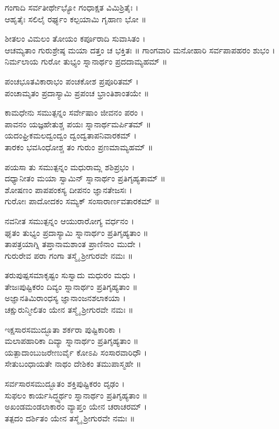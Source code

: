 ಗಂಗಾದಿ ಸರ್ವತೀರ್ಥೇಭ್ಯೋ ಗಂಧಾಕ್ಷತ ವಿಮಿಶ್ರಿತೈಃ ।\\
ಆಹೃತೈಃ ಸಲಿಲೈ ರರ್ಘ್ಯಂ ಕಲ್ಪಯಾಮಿ ಗೃಹಾಣ ಭೋ ॥

ಶೀತಲಂ ವಿಮಲಂ ತೋಯಂ ಕರ್ಪೂರಾದಿ ಸುವಾಸಿತಂ ।\\
ಆಚಮ್ಯತಾಂ ಗುರುಶ್ರೇಷ್ಠ ಮಯಾ ದತ್ತಂ ಚ ಭಕ್ತಿತಃ ॥
\newpage
ಗಾಂಗವಾರಿ ಮನೋಹಾರಿ ಸರ್ವಪಾಪಹರಂ ಶುಭಂ ।\\
ನಿರ್ಮಲಾಯ ಗುರೋ ತುಭ್ಯಂ ಸ್ನಾನಾರ್ಥಂ ಪ್ರದದಾಮ್ಯಹಮ್ ॥

ಪಂಚಭೂತವಿಕಾರಾಭಂ ಪಂಚಕೋಶ ಪ್ರಪೂರಿತಮ್ ।\\
ಪಂಚಾಮೃತಂ ಪ್ರದಾಸ್ಯಾಮಿ ಪ್ರಪಂಚ ಭ್ರಾಂತಿಶಾಂತಯೇ ॥\\

ಕಾಮಧೇನು ಸಮುತ್ಪನ್ನಂ ಸರ್ವೇಷಾಂ ಜೀವನಂ ಪರಂ ।\\
ಪಾವನಂ ಯಜ್ಞಹೇತುಶ್ಚ ಪಯಃ ಸ್ನಾನಾರ್ಥಮರ್ಪಿತಮ್ ॥\\
ಯದಂಘ್ರಿಕಮಲದ್ವಂದ್ವಂ ದ್ವಂದ್ವತಾಪನಿವಾರಕಮ್ ।\\
ತಾರಕಂ ಭವಸಿಂಧೋಶ್ಚ ತಂ ಗುರುಂ ಪ್ರಣಮಾಮ್ಯಹಮ್ ॥

ಪಯಸಾ ತು ಸಮುತ್ಪನ್ನಂ ಮಧುರಾಮ್ಲ ಶಶಿಪ್ರಭಂ ।\\
ದಧ್ಯಾನೀತಂ ಮಯಾ ಸ್ವಾಮಿನ್ ಸ್ನಾನಾರ್ಥಂ ಪ್ರತಿಗೃಹ್ಯತಾಮ್ ॥\\
ಶೋಷಣಂ ಪಾಪಪಂಕಸ್ಯ ದೀಪನಂ ಜ್ಞಾನತೇಜಸಃ ।\\
ಗುರೋಃ ಪಾದೋದಕಂ ಸಮ್ಯಕ್ ಸಂಸಾರಾರ್ಣವತಾರಕಮ್ ॥

ನವನೀತ ಸಮುತ್ಪನ್ನಂ ಆಯುರಾರೋಗ್ಯ ವರ್ಧನಂ ।\\
ಘೃತಂ ತುಭ್ಯಂ ಪ್ರದಾಸ್ಯಾಮಿ ಸ್ನಾನಾರ್ಥಂ ಪ್ರತಿಗೃಹ್ಯತಾಂ ॥\\
ತಾಪತ್ರಯಾಗ್ನಿ ತಪ್ತಾನಾಮಶಾಂತ ಪ್ರಾಣಿನಾಂ ಮುದೇ ।\\
ಗುರುರೇವ ಪರಾ ಗಂಗಾ ತಸ್ಮೈ ಶ್ರೀಗುರವೇ ನಮಃ ॥

ತರುಪುಷ್ಪಸಮಾಕೃಷ್ಟಂ ಸುಸ್ವಾದು ಮಧುರಂ ಮಧು ।\\
ತೇಜಃಪುಷ್ಟಿಕರಂ ದಿವ್ಯಂ ಸ್ನಾನಾರ್ಥಂ ಪ್ರತಿಗೃಹ್ಯತಾಂ ॥ \\
ಅಜ್ಞಾನತಿಮಿರಾಂಧಸ್ಯ ಜ್ಞಾನಾಂಜನಶಲಾಕಯಾ ।\\
ಚಕ್ಷುರುನ್ಮೀಲಿತಂ ಯೇನ ತಸ್ಮೈ ಶ್ರೀಗುರವೇ ನಮಃ ॥

ಇಕ್ಷಸಾರಸಮುದ್ಭೂತಾ ಶರ್ಕರಾ ಪುಷ್ಟಿಕಾರಿಕಾ ।\\
ಮಲಾಪಹಾರಿಕಾ ದಿವ್ಯಾ ಸ್ನಾನಾರ್ಥಂ ಪ್ರತಿಗೃಹ್ಯತಾಂ ॥\\
ಯತ್ಪಾದಾಂಬುಜರೇಣುರ್ವೈ ಕೋಽಪಿ ಸಂಸಾರವಾರಿಧೌ ।\\
ಸೇತುಬಂಧಾಯತೇ ನಾಥಂ ದೇಶಿಕಂ ತಮುಪಾಸ್ಮಹೇ ॥

ಸರ್ವಸಾರಸಮುದ್ಭೂತಂ ಶಕ್ತಿಪುಷ್ಟಿಕರಂ ದೃಢಂ ।\\
ಸುಫಲಂ ಕಾರ್ಯಸಿದ್ಧ್ಯರ್ಥಂ ಸ್ನಾನಾರ್ಥಂ ಪ್ರತಿಗೃಹ್ಯತಾಂ ॥\\
ಅಖಂಡಮಂಡಲಾಕಾರಂ ವ್ಯಾಪ್ತಂ ಯೇನ ಚರಾಚರಮ್ ।\\
ತತ್ಪದಂ ದರ್ಶಿತಂ ಯೇನ ತಸ್ಮೈ ಶ್ರೀಗುರವೇ ನಮಃ ॥


